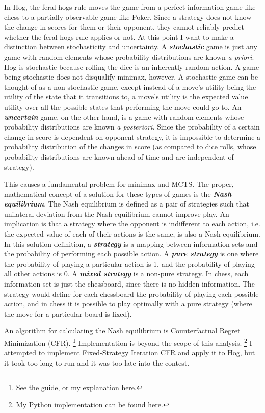 \documentclass[11pt, oneside]{article}
\newcommand{\emphasis}[1]{\textbf{\textit{#1}}}
\begin{document}
In Hog, the feral hogs rule moves the game from a perfect information
game like chess to a partially observable game like Poker.
Since a strategy does not know the change in scores for them or their opponent,
they cannot reliably predict whether the feral hogs rule applies or not. 
At this point I want to make a distinction between stochasticity and uncertainty.
A \emphasis{stochastic} game is just any game with random elements
whose probability distributions are known \textit{a priori}.
Hog is stochastic because rolling the dice is an inherently random action.
A game being stochastic does not disqualify minimax, however.
A stochastic game can be thought of as a non-stochastic game,
except instead of a move's utility being the utility of the state 
that it transitions to, a move's utility is the expected value utility
over all the possible states that performing the move could go to.
An \emphasis{uncertain} game, on the other hand, is a game with random elements 
whose probability distributions are known \textit{a posteriori}.
Since the probability of a certain change in score is dependent on
opponent strategy, it is impossible to determine a probability distribution
of the changes in score (as compared to dice rolls, whose probability 
distributions are known ahead of time and are independent of strategy).

This causes a fundamental problem for minimax and MCTS.
The proper, mathematical concept of a solution for these types of games
is the \emphasis{Nash equilibrium}. The Nash equilibrium is defined 
as a pair of strategies such that unilateral deviation from 
the Nash equilibrium cannot improve play. 
An implication is that a strategy where the opponent
is indifferent to each action, i.e. the expected value of each of their actions
is the same, is also a Nash equilibrium. In this solution definition,
a \emphasis{strategy} is a mapping between information sets and 
the probability of performing each possible action.
A \emphasis{pure strategy} is one where 
the probability of playing a particular action is 1, 
and the probability of playing all other actions is 0.
A \emphasis{mixed strategy} is a non-pure strategy.
In chess, each information set is just the chessboard,
since there is no hidden information.
The strategy would define for each chessboard the probability of playing
each possible action, and in chess it is possible to play optimally 
with a pure strategy (where the move for a particular board is fixed).

An algorithm for calculating the Nash equilibrium is 
Counterfactual Regret Minimization (CFR).
\footnote{See the \href{http://modelai.gettysburg.edu/2013/cfr/cfr.pdf}{guide},
or my explanation 
\href{https://github.com/stephen-huan/sct-lectures/blob/master/ml/gametheory/lecture.pdf}{here}.}
Implementation is beyond the scope of this analysis.
\footnote{My Python implementation can be found 
\href{https://github.com/stephen-huan/Counterfactual-Regret-Minimization}{here}.}
I attempted to implement Fixed-Strategy Iteration CFR and apply it to Hog, 
but it took too long to run and it was too late into the contest.
\end{document}
